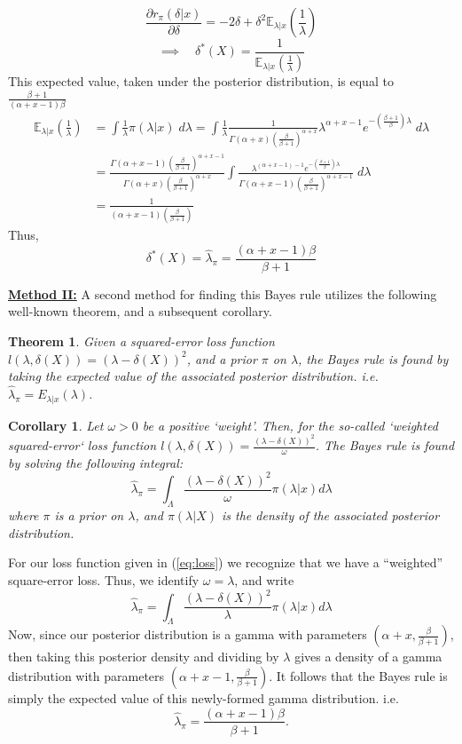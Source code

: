 \documentclass[11pt]{report}
\newtheorem{corollary}{Corollary}
\newtheorem{theorem}{Theorem}
\begin{document}
$$\frac{\partial r_\pi(\delta|x)}{\partial \delta} =  - 2\delta + \delta^2\mathbb{E}_{\lambda|x}\left(\frac{1}{\lambda} \right )$$
$$\implies \quad \delta^*(X) = \frac{1}{\mathbb{E}_{\lambda|x}\left(\frac{1}{\lambda} \right )}$$
This expected value, taken under the posterior distribution, is equal to $\frac{\beta+1}{(\alpha +x-1)\beta}$
\begin{align*}
\mathbb{E}_{\lambda|x}\left(\frac{1}{\lambda} \right) 
& = \int \frac{1}{\lambda} \pi(\lambda|x) \; d\lambda 
= \int \frac{1}{\lambda} \frac{1}{\Gamma(\alpha+x)\left(\frac{\beta}{\beta+1}\right)^{\alpha+x}}\lambda^{\alpha+x-1}e^{-(\frac{\beta+1}{\beta})\lambda} \; d\lambda \\
& = \frac{\Gamma(\alpha+x-1)\left(\frac{\beta}{\beta+1}\right)^{\alpha+x-1}}{\Gamma(\alpha+x)\left(\frac{\beta}{\beta+1}\right)^{\alpha+x}}\int\frac{\lambda^{(\alpha+x-1)-1}e^{-(\frac{\beta+1}{\beta})\lambda}}{\Gamma(\alpha+x-1)\left(\frac{\beta}{\beta+1}\right)^{\alpha+x-1}} \; d\lambda \\
& = \frac{1}{(\alpha+x-1)\left(\frac{\beta}{\beta+1}\right)}
\end{align*}		
Thus, 
$$\delta^*(X) = \widehat{\lambda}_\pi =\frac{(\alpha +x-1)\beta}{\beta+1} $$

\underline{\textbf{Method II:}} A second method for finding this Bayes rule utilizes the following well-known theorem, and a subsequent corollary. 

\begin{theorem}
Given a squared-error loss function $l(\lambda, \delta(X)) = (\lambda - \delta(X))^2$, and a prior $\pi$ on $\lambda$, the Bayes rule is found by taking the expected value of the associated posterior distribution. i.e. $\widehat{\lambda}_\pi = E_{\lambda|x}(\lambda)$. 
\end{theorem}

\begin{corollary}
Let $\omega >0$ be a positive `weight'. Then, for the so-called `weighted squared-error` loss function $l(\lambda, \delta(X)) = \frac{(\lambda - \delta(X))^2}{\omega}$. The Bayes rule is found by solving the following integral:
$$\widehat{\lambda}_\pi = \int_\Lambda\frac{(\lambda - \delta(X))^2}{\omega} \pi(\lambda|x) d\lambda$$
where $\pi$ is a prior on $\lambda$, and $\pi(\lambda|X)$ is the density of the associated posterior distribution. 
\end{corollary}			

For our loss function given in (\ref{eq:loss}) we recognize that we have a ``weighted'' square-error loss. Thus, we identify $\omega = \lambda$, and write  
$$\widehat{\lambda}_\pi = \int_\Lambda\frac{(\lambda - \delta(X))^2}{\lambda} \pi(\lambda|x) d\lambda$$
Now, since our posterior distribution is a gamma with parameters $\left(\alpha+x, \frac{\beta}{\beta+1}\right)$, then taking this posterior density and dividing by $\lambda$ gives a density of a gamma distribution with parameters $\left(\alpha+x-1, \frac{\beta}{\beta+1}\right)$. It follows that the Bayes rule is simply the expected value of this newly-formed gamma distribution. i.e.
$$\widehat{\lambda}_\pi = \frac{(\alpha +x-1)\beta}{\beta+1}.$$
		
\end{document}
